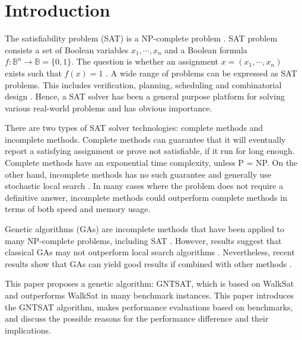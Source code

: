 \section {Introduction}
The satisfiability problem (SAT) is a NP-complete problem
\parencite{cook_1971}. SAT problem consists a set of Boolean variables
$x_1, \cdots, x_n$ and a Boolean formula $f: \mathbb{B}^n \rightarrow \mathbb{B}=\{0, 1\}$. The
question is whether an assignment $x=(x_1, \cdots, x_n)$ exists such that
$f(x)=1$ \parencite{gottlieb_marchiori_rossi_2002}. A wide range of problems can be
expressed as SAT problems. This includes verification, planning, scheduling
and combinatorial design \parencite{biere2009handbook}. Hence, a SAT solver has been a
general purpose platform for solving various real-world problems and has
obvious importance.

There are two types of SAT solver technologies: complete methods and
incomplete methods. Complete methods can guarantee that it will eventually
report a satisfying assignment or prove not satisfiable, if it run for long
enough. Complete methods have an exponential time complexity, unless P = NP.
On the other hand, incomplete methods has no such guarantee and generally use
stochastic local search \parencite{gomes_kautz_sabharwal_selman_2008}. In many cases where the problem
does not require a definitive answer, incomplete methods could outperform
complete methods in terms of both speed and memory usage.

Genetic algorithms (GAs) are incomplete methods that have been applied to many
NP-complete problems, including SAT \parencite{gottlieb_marchiori_rossi_2002}. However, results
suggest that classical GAs may not outperform local search algorithms
\parencite{de1989using}. Nevertheless, recent results show that GAs can yield
good results if combined with other methods \parencite{gottlieb_marchiori_rossi_2002}.

This paper proposes a genetic algorithm: GNTSAT, which is based on WalkSat
\parencite{selman1994noise} and outperforms WalkSat in many benchmark instances.
This paper introduces the GNTSAT algorithm, makes performance evaluations
based on benchmarks, and discuss the possible reasons for the performance
difference and their implications.
